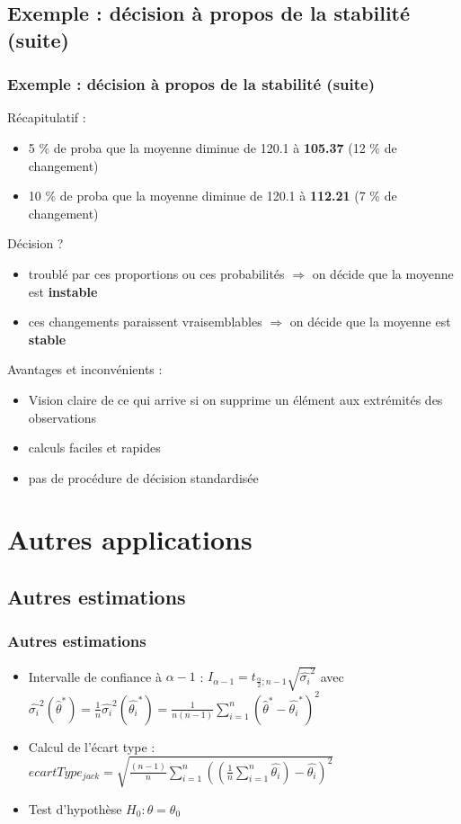 \documentclass[handout]{beamer}
\begin{document}
		\subsection{Exemple : décision à propos de la stabilité (suite)}
		\begin{frame}
			\frametitle{Exemple : décision à propos de la stabilité (suite)}
			Récapitulatif :
			\begin{itemize}
				\item 5 \% de proba que la moyenne diminue de 120.1 à \textbf{105.37} (12 \% de changement)
				\item 10 \% de proba que la moyenne diminue de 120.1 à \textbf{112.21} (7 \% de changement)
			\end{itemize}

			\vspace{5px}
			Décision ?
			\begin{itemize}
				\item troublé par ces proportions ou ces probabilités $\Rightarrow$ on décide que la moyenne est \textbf{instable}
				\item ces changements paraissent vraisemblables $\Rightarrow$ on décide que la moyenne est \textbf{stable}
			\end{itemize}

			\vspace{5px}
			Avantages et inconvénients :
			\begin{itemize}
				\item Vision claire de ce qui arrive si on supprime un élément aux extrémités des observations
				\item calculs faciles et rapides
				\item pas de procédure de décision standardisée
			\end{itemize}
		\end{frame}
		
		
		\section{Autres applications}
		\subsection{Autres estimations}
		\begin{frame}
			\frametitle{Autres estimations}
			\begin{itemize}
				\item Intervalle de confiance à $\alpha - 1$ : $I_{\alpha-1} = t_{\frac{\alpha}{2};n-1}\sqrt{\hat{\sigma_i}^2}$ avec $\hat{\sigma_i}^2(\hat{\theta}^*) = \frac{1}{n}\hat{\sigma_i}^2(\hat{\theta_i}^*) = \frac{1}{n(n-1)}\sum\limits_{i=1}^n (\hat{\theta}^* - \hat{\theta_i}^*)^2$
				\item Calcul de l'écart type : $ecartType_{jack} = \sqrt{\frac{(n - 1)}{n} \sum\limits_{i=1}^n ((\frac{1}{n} \sum\limits_{i=1}^n \hat{\theta_i}) - \hat{\theta_i})^2}$
				\item Test d'hypothèse $H_0 : \theta = \theta_0$
			\end{itemize}
		\end{frame}
		
\end{document}
